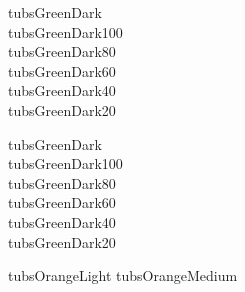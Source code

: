 \documentclass[rgb]{tubsartcl}
\begin{document}

\textcolor{tuGreenDark}{tubsGreenDark}\\
\textcolor{tuGreenDark100}{tubsGreenDark100}\\
\textcolor{tuGreenDark80}{tubsGreenDark80}\\
\textcolor{tuGreenDark60}{tubsGreenDark60}\\
\textcolor{tuGreenDark40}{tubsGreenDark40}\\
\textcolor{tuGreenDark20}{tubsGreenDark20}

\textcolor{tubsGreenDark}{tubsGreenDark}\\
\textcolor{tubsGreenDark100}{tubsGreenDark100}\\
\textcolor{tubsGreenDark80}{tubsGreenDark80}\\
\textcolor{tubsGreenDark60}{tubsGreenDark60}\\
\textcolor{tubsGreenDark40}{tubsGreenDark40}\\
\textcolor{tubsGreenDark20}{tubsGreenDark20}



\textcolor{tubsOrangeLight}{tubsOrangeLight}
\textcolor{tubsOrangeMedium}{tubsOrangeMedium}
\end{document}
